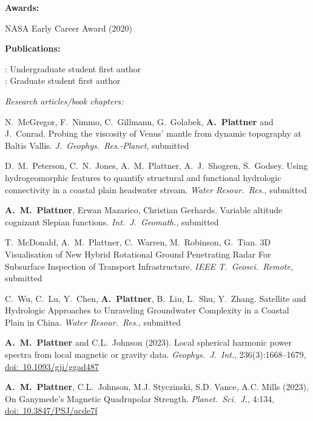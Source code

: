 \documentclass[10pt]{article}
\begin{document}
\spc
\textbf{\tsize Awards:}

\spcp
NASA Early Career Award (2020)


\spc
\textbf{\tsize Publications:}

\spcp
\ug: Undergraduate student first author\\
\gr: Graduate student first author


\spcp
\emph{Research articles/book chapters:}


\spcp N.\ McGregor, F.\ Nimmo, C.\ Gillmann, G.\ Golabek, \textbf{A.\ Plattner} and J.\ Conrad. Probing the viscosity of Venus' mantle from dynamic topography at Baltis Vallis. \emph{J.~Geophys.~Res.-Planet}, submitted

\spcp
D.\ M.\ Peterson, C.\ N.\ Jones, A.\ M.\ Plattner, A.\ J.\ Shogren, S.\ Godsey. Using hydrogeomorphic features to quantify structural and functional hydrologic connectivity in a coastal plain headwater stream. \emph{Water Resour.\ Res.}, submitted

\spcp
\textbf{A.~M.~Plattner}, Erwan Mazarico, Christian Gerhards. Variable altitude cognizant Slepian functions. \emph{Int.~J.~Geomath.}, submitted

\spcp
T.\ McDonald, A.\ M.\ Plattner, C.\ Warren, M.\ Robinson, G.\ Tian. 3D Visualisation of New Hybrid Rotational Ground Penetrating Radar For Subsurface Inspection of Transport Infrastructure. \emph{IEEE T.\ Geosci.\ Remote}, submitted

\spcp C.\ Wu, C.\ Lu, Y.\ Chen, \textbf{A.\ Plattner}, B.\ Liu, L.\ Shu, Y.\ Zhang. Satellite and Hydrologic Approaches to Unraveling Groundwater Complexity in a Coastal Plain in China. \emph{Water Resour.\ Res.}, submitted

\spcp
\shift[17] \textbf{A.~M.~Plattner} and C.L.~Johnson (2023). Local spherical harmonic power spectra from local magnetic or gravity data. \emph{Geophys.~J.~Int.}, 236(3):1668--1679,  \href{https://doi.org/10.1093/gji/ggad487}{doi:~10.1093/gji/ggad487} 

\spcp
\shift[16] \textbf{A.~M.~Plattner}, C.L.~Johnson, M.J. Styczinski, S.D. Vance, A.C. Mills (2023), On Ganymede's Magnetic Quadrupolar Strength. \emph{Planet.\ Sci.\ J.}, 4:134, \href{https://doi.org/10.3847/PSJ/acde7f}{doi:~10.3847/PSJ/acde7f} 

\end{document}
